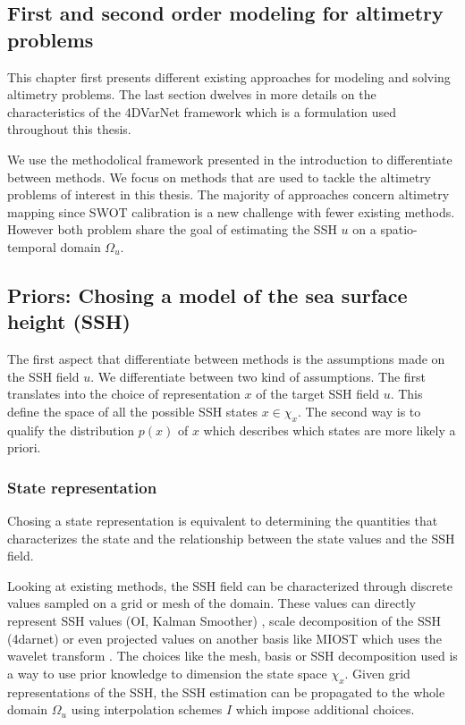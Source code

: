\begin{bibunit}

  \chapter*{First and second order modeling for altimetry problems}

This chapter first presents different existing approaches for modeling  and solving altimetry problems.
The last section dwelves in more details on the characteristics of the 4DVarNet framework which is a formulation used throughout this thesis.
 
We use the methodolical framework presented in the introduction to differentiate between methods.
  We focus on methods that are used to tackle the altimetry problems of interest in this thesis. The majority of approaches concern altimetry mapping since SWOT calibration is a new challenge with fewer existing methods. However both problem share the goal of estimating the SSH $u$ on a spatio-temporal domain $\Omega_u$.
 
 
\section{Priors: Chosing a model of the sea surface height (SSH)}
The first aspect that differentiate between methods is the assumptions made on the SSH field $u$.
We differentiate between two kind of assumptions.
The first translates into the choice of representation $x$ of the target SSH field $u$. This define the space of all the possible SSH states $x \in \chi_x$. The second way is to qualify the distribution $p(x)$ of $x$ which describes which states are more likely a priori.


 
  \subsection{State representation}
Chosing a state representation is equivalent to determining the quantities that characterizes the state and the relationship between the state values and the SSH field.


  Looking at existing methods, the SSH field can be characterized through discrete values sampled on a grid or mesh of the domain. These values can directly represent SSH values (OI, Kalman Smoother) \cite{}, scale decomposition of the SSH \cite{}(4darnet) or even projected values on another basis like MIOST \cite{} which uses the wavelet transform \Gamma.
  The choices like the mesh, basis or SSH decomposition used is a way to use prior knowledge to dimension the state space $\chi_x$. Given grid representations of the SSH, the SSH estimation can be propagated to the whole domain $\Omega_u$ using interpolation schemes $I$ which impose additional choices.


\end{bibunit}
